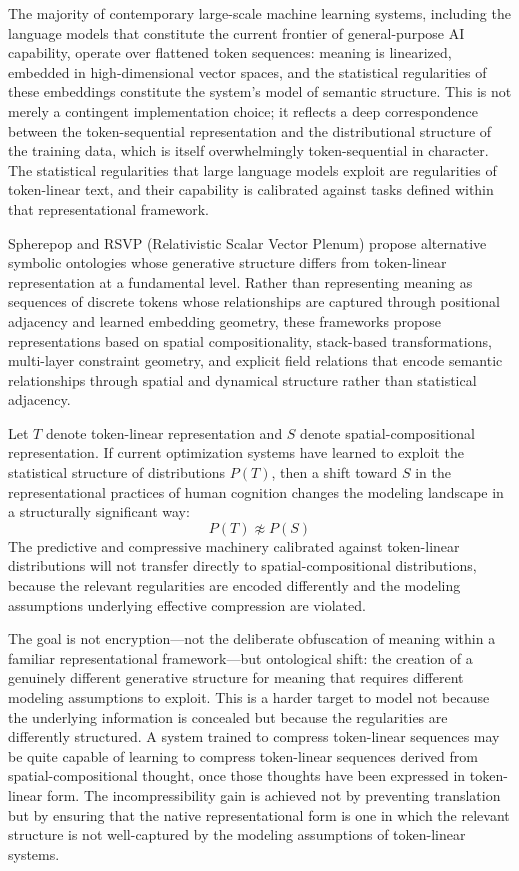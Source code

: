 \documentclass[12pt]{article}
\begin{document}
The majority of contemporary large-scale machine learning systems, including the language models that constitute the current frontier of general-purpose AI capability, operate over flattened token sequences: meaning is linearized, embedded in high-dimensional vector spaces, and the statistical regularities of these embeddings constitute the system's model of semantic structure. This is not merely a contingent implementation choice; it reflects a deep correspondence between the token-sequential representation and the distributional structure of the training data, which is itself overwhelmingly token-sequential in character. The statistical regularities that large language models exploit are regularities of token-linear text, and their capability is calibrated against tasks defined within that representational framework.

Spherepop and RSVP (Relativistic Scalar Vector Plenum) propose alternative symbolic ontologies whose generative structure differs from token-linear representation at a fundamental level. Rather than representing meaning as sequences of discrete tokens whose relationships are captured through positional adjacency and learned embedding geometry, these frameworks propose representations based on spatial compositionality, stack-based transformations, multi-layer constraint geometry, and explicit field relations that encode semantic relationships through spatial and dynamical structure rather than statistical adjacency.

Let $T$ denote token-linear representation and $S$ denote spatial-compositional representation. If current optimization systems have learned to exploit the statistical structure of distributions $P(T)$, then a shift toward $S$ in the representational practices of human cognition changes the modeling landscape in a structurally significant way:
\[
P(T) \not\approx P(S)
\]
The predictive and compressive machinery calibrated against token-linear distributions will not transfer directly to spatial-compositional distributions, because the relevant regularities are encoded differently and the modeling assumptions underlying effective compression are violated.

The goal is not encryption---not the deliberate obfuscation of meaning within a familiar representational framework---but ontological shift: the creation of a genuinely different generative structure for meaning that requires different modeling assumptions to exploit. This is a harder target to model not because the underlying information is concealed but because the regularities are differently structured. A system trained to compress token-linear sequences may be quite capable of learning to compress token-linear sequences derived from spatial-compositional thought, once those thoughts have been expressed in token-linear form. The incompressibility gain is achieved not by preventing translation but by ensuring that the native representational form is one in which the relevant structure is not well-captured by the modeling assumptions of token-linear systems.
\end{document}
